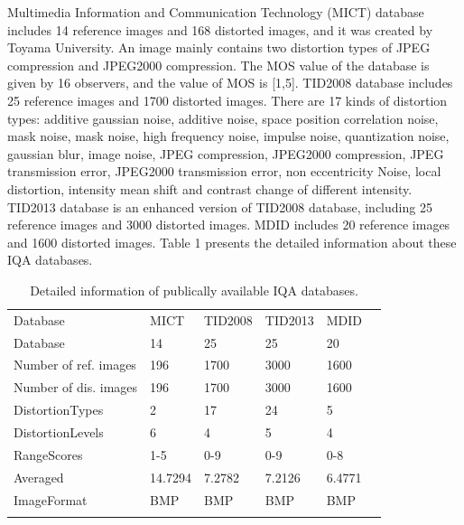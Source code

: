 Multimedia Information and Communication Technology  (MICT) database includes 14 reference images and 168 distorted images, and it was created by Toyama University. An image mainly contains two distortion types of JPEG compression and JPEG2000 compression. The MOS value of the database is given by 16 observers, and the value of MOS is [1,5].
TID2008 database includes 25 reference images and 1700 distorted images. There are 17 kinds of distortion types: additive gaussian noise, additive noise, space position correlation noise, mask noise, mask noise, high frequency noise, impulse noise, quantization noise, gaussian blur, image noise, JPEG compression, JPEG2000 compression, JPEG transmission error, JPEG2000 transmission error, non eccentricity Noise, local distortion, intensity mean shift and contrast change of different intensity.
TID2013 database is an enhanced version of TID2008 database, including 25 reference images and 3000 distorted images. 
MDID includes 20 reference images and 1600 distorted images. Table 1 presents the detailed information about these IQA databases.



\begin{table}
\caption{Detailed information of publically available IQA databases.}
\label{tab:1}       %
\begin{tabular}{llllll}
\hline\noalign{\smallskip}
Database & MICT & TID2008 & TID2013 & MDID &  \\
\noalign{\smallskip}\hline\noalign{\smallskip}
Database					& 14				& 25					&25					& 20			\\
Number of ref. images		& 196			& 1700				&3000				&1600		\\
Number of dis. images	     	&196				&1700 				&3000  				&1600 		\\
DistortionTypes		    		&2				&17 					&24  					&5 			\\
DistortionLevels	     		&6				&4   					&5   					&4   			\\
RangeScores			   	&1-5				&0-9 				&0-9 				&0-8			\\
Averaged			 		&14.7294			&7.2782  				&7.2126 				&6.4771		\\
ImageFormat			 	&BMP			&BMP  				&BMP 				&BMP		\\
\noalign{\smallskip}\hline
\end{tabular}
\end{table}






